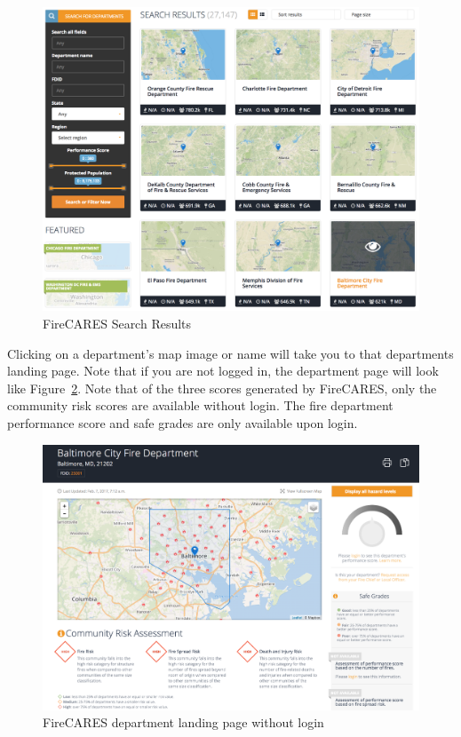 \documentclass[12pt,oneside]{book}
\begin{document}
\begin{figure}[ht!]
\centering
\includegraphics[width=.9\columnwidth]{Figures/search_results}
\caption{FireCARES Search Results}
\label{fig:search}
\end{figure}

\FloatBarrier

Clicking on a department's map image or name will take you to that departments landing page. Note that if you are not logged in, the department page will look like Figure~\ref{fig:department_page_nologin}. Note that of the three scores generated by FireCARES, only the community risk scores are available without login. The fire department performance score and safe grades are only available upon login.

\begin{figure}[ht!]
\centering
\includegraphics[width=.9\columnwidth]{Figures/department_page_logout}
\caption{FireCARES department landing page without login}
\label{fig:department_page_nologin}
\end{figure}
\end{document}
